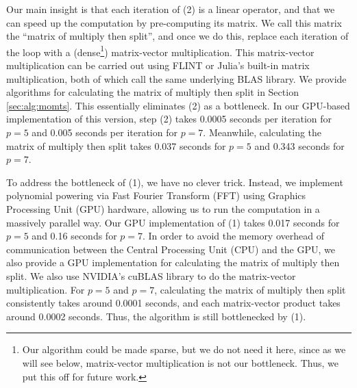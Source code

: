 Our main insight is that each iteration
of (2) is a linear operator, and that we can speed
up the computation by pre-computing its matrix.
We call this matrix the ``matrix of multiply then split'',
and once we do this, replace each iteration of the loop 
with a (dense\footnote{
    Our algorithm could be made sparse, but we do not need it here,
    since as we will see below, matrix-vector multiplication
    is not our bottleneck.
    Thus, we put this off for future work.
}) matrix-vector multiplication.
This matrix-vector multiplication can be carried out using FLINT
or Julia's built-in matrix multiplication, both of which call the same
underlying BLAS library.
We provide algorithms for calculating the matrix of multiply
then split in Section \ref{sec:alg:momts}.
This essentially eliminates (2) as a bottleneck.
In our GPU-based implementation of this version, step (2) takes
0.0005 seconds per iteration for \(p = 5\) and 0.005 seconds per iteration for \(p = 7\).
Meanwhile, calculating the matrix of multiply then split
takes 0.037 seconds for \(p=5\) and 
0.343 seconds for \(p = 7\).

To address the bottleneck of (1),
we have no clever trick. 
Instead, we implement polynomial powering via Fast Fourier Transform (FFT) using
Graphics Processing Unit (GPU) hardware,
allowing us to run the computation in a massively parallel way.
Our GPU implementation of (1) takes 0.017 seconds for \(p = 5\) and 0.16 seconds for \(p = 7\).
In order to avoid the memory overhead of communication between the Central Processing Unit (CPU) and
the GPU, we also provide a GPU implementation for calculating the matrix
of multiply then split. 
We also use NVIDIA's cuBLAS library \cite{nvidia-2024-cublas} to
do the matrix-vector multiplication.
For $p=5$ and $p=7$, calculating the matrix of multiply then split consistently takes around 0.0001
seconds, and each matrix-vector product takes around 0.0002 seconds.
Thus, the algorithm is still bottlenecked by (1).


